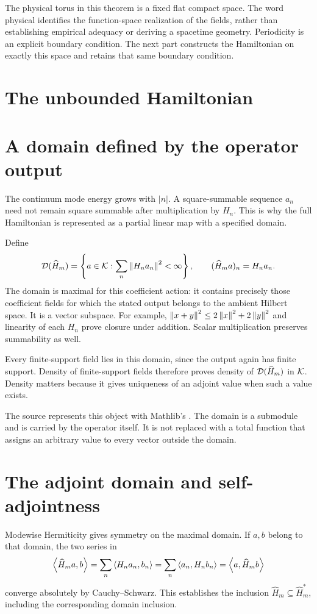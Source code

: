 
The physical torus in this theorem is a fixed flat compact space. The word physical identifies the function-space realization of the fields, rather than establishing empirical adequacy or deriving a spacetime geometry. Periodicity is an explicit boundary condition. The next part constructs the Hamiltonian on exactly this space and retains that same boundary condition.

\clearpage
\section*{The unbounded Hamiltonian}
\section{A domain defined by the operator output}
The continuum mode energy grows with $|n|$. A square-summable sequence $a_n$ need not remain square summable after multiplication by $H_n$. This is why the full Hamiltonian is represented as a partial linear map with a specified domain.

Define
\[
\mathcal D(\widehat H_m)
=\left\{a\in\mathcal K:\sum_n\left\lVert H_na_n\right\rVert^2<\infty\right\},
\qquad
(\widehat H_ma)_n=H_na_n.
\]
The domain is maximal for this coefficient action: it contains precisely those coefficient fields for which the stated output belongs to the ambient Hilbert space. It is a vector subspace. For example, $\left\lVert x+y\right\rVert^2\le2\left\lVert x\right\rVert^2+2\left\lVert y\right\rVert^2$ and linearity of each $H_n$ prove closure under addition. Scalar multiplication preserves summability as well.

Every finite-support field lies in this domain, since the output again has finite support. Density of finite-support fields therefore proves density of $\mathcal D(\widehat H_m)$ in $\mathcal K$. Density matters because it gives uniqueness of an adjoint value when such a value exists.

The source represents this object with Mathlib's . The domain is a submodule and is carried by the operator itself. It is not replaced with a total function that assigns an arbitrary value to every vector outside the domain.


\section{The adjoint domain and self-adjointness}
Modewise Hermiticity gives symmetry on the maximal domain. If $a,b$ belong to that domain, the two series in
\[
\left\langle\widehat H_ma,b\right\rangle
=\sum_n\left\langle H_na_n,b_n\right\rangle
=\sum_n\left\langle a_n,H_nb_n\right\rangle
=\left\langle a,\widehat H_mb\right\rangle
\]
converge absolutely by Cauchy--Schwarz. This establishes the inclusion $\widehat H_m\subseteq\widehat H_m^*$, including the corresponding domain inclusion.

